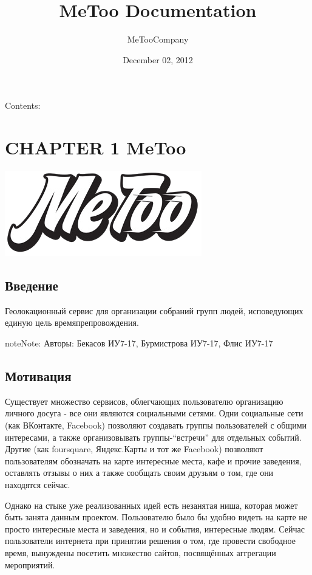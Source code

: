 \documentclass[letterpaper,10pt,english]{sphinxmanual}
\title{MeToo Documentation}
\date{December 02, 2012}
\author{MeTooCompany}
\begin{document}
\maketitle
\tableofcontents
{}\label{index::doc}


Contents:


\chapter{CHAPTER 1 MeToo}
\label{intr::doc}\label{intr:welcome-to-metoo-s-documentation}\label{intr:chapter-1-metoo}
\includegraphics{metoo2.png}


\section{Введение}
\label{intr:id1}
Геолокационный сервис для организации собраний групп людей, исповедующих единую цель времяпрепровождения.

\begin{notice}{note}{Note:}
Авторы: Бекасов ИУ7-17, Бурмистрова ИУ7-17, Флис ИУ7-17
\end{notice}


\section{Мотивация}
\label{intr:id2}
Существует множество сервисов, облегчающих пользователю организацию личного досуга - все они являются социальными сетями. Одни социальные сети (как ВКонтакте, Facebook) позволяют создавать группы пользователей с общими интересами, а также организовывать группы-“встречи” для отдельных событий. Другие (как foursquare, Яндекс.Карты и тот же Facebook) позволяют пользователям обозначать на карте интересные места, кафе и прочие заведения, оставлять отзывы о них а также сообщать своим друзьям о том, где они находятся сейчас.

Однако на стыке уже реализованных идей есть незанятая ниша, которая может быть занята данным проектом. Пользователю было бы удобно видеть на карте не просто интересные места и заведения, но и события, интересные людям. Сейчас пользователи интернета при принятии решения о том, где провести свободное время, вынуждены посетить множество сайтов, посвящённых аггрегации мероприятий.
\end{document}
